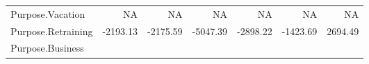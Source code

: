 \documentclass[]{article}
\begin{document}
\begin{longtable}[]{@{}lrrrrrr@{}}
\begin{minipage}[t]{0.31\columnwidth}\raggedright\strut
Purpose.Vacation\strut
\end{minipage} & \begin{minipage}[t]{0.10\columnwidth}\raggedleft\strut
NA\strut
\end{minipage} & \begin{minipage}[t]{0.08\columnwidth}\raggedleft\strut
NA\strut
\end{minipage} & \begin{minipage}[t]{0.08\columnwidth}\raggedleft\strut
NA\strut
\end{minipage} & \begin{minipage}[t]{0.08\columnwidth}\raggedleft\strut
NA\strut
\end{minipage} & \begin{minipage}[t]{0.08\columnwidth}\raggedleft\strut
NA\strut
\end{minipage} & \begin{minipage}[t]{0.08\columnwidth}\raggedleft\strut
NA\strut
\end{minipage}\tabularnewline
\begin{minipage}[t]{0.31\columnwidth}\raggedright\strut
Purpose.Retraining\strut
\end{minipage} & \begin{minipage}[t]{0.10\columnwidth}\raggedleft\strut
-2193.13\strut
\end{minipage} & \begin{minipage}[t]{0.08\columnwidth}\raggedleft\strut
-2175.59\strut
\end{minipage} & \begin{minipage}[t]{0.08\columnwidth}\raggedleft\strut
-5047.39\strut
\end{minipage} & \begin{minipage}[t]{0.08\columnwidth}\raggedleft\strut
-2898.22\strut
\end{minipage} & \begin{minipage}[t]{0.08\columnwidth}\raggedleft\strut
-1423.69\strut
\end{minipage} & \begin{minipage}[t]{0.08\columnwidth}\raggedleft\strut
2694.49\strut
\end{minipage}\tabularnewline
\begin{minipage}[t]{0.31\columnwidth}\raggedright\strut
Purpose.Business\strut
\end{minipage} & \begin{minipage}[t]{0.10\columnwidth}\raggedleft\strut

\end{minipage}
\end{longtable}
\end{document}
